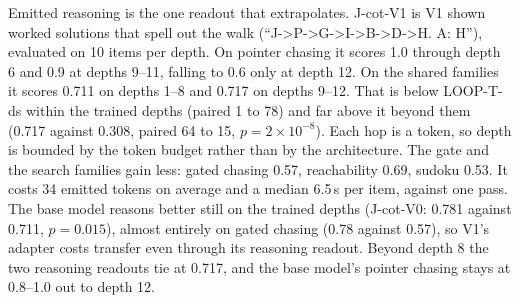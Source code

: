 \documentclass[11pt]{article}
\begin{document}
Emitted reasoning is the one readout that extrapolates. J-cot-V1 is V1 shown worked solutions
that spell out the walk (``J->P->G->I->B->D->H. A: H''), evaluated on 10 items per depth. On
pointer chasing it scores 1.0 through depth 6 and 0.9 at depths 9--11, falling to 0.6 only at
depth 12. On the shared families it scores 0.711 on depths 1--8 and 0.717 on depths 9--12. That
is below LOOP-T-ds within the trained depths (paired 1 to 78) and far above it beyond them
(0.717 against 0.308, paired 64 to 15, $p=2\times10^{-8}$). Each hop is a token, so depth is
bounded by the token budget rather than by the architecture. The gate and the search families
gain less: gated chasing 0.57, reachability 0.69, sudoku 0.53. It costs 34 emitted tokens on
average and a median 6.5\,s per item, against one pass. The base model reasons better still on
the trained depths (J-cot-V0: 0.781 against 0.711, $p=0.015$), almost entirely on gated chasing
(0.78 against 0.57), so V1's adapter costs transfer even through its reasoning readout. Beyond
depth 8 the two reasoning readouts tie at 0.717, and the base model's pointer chasing stays at
0.8--1.0 out to depth 12.
\end{document}

